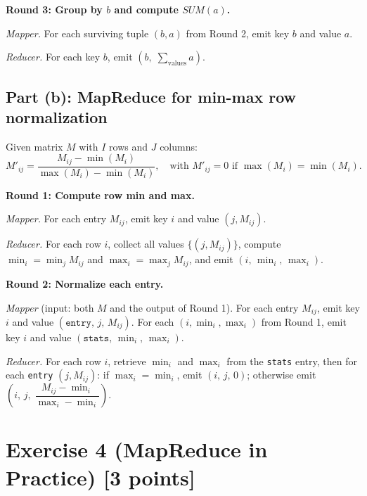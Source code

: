 \documentclass[a4paper,11pt]{article}
\begin{document}
\medskip

\textbf{Round 3: Group by $b$ and compute $SUM(a)$.}

\textit{Mapper.} For each surviving tuple $(b, a)$ from Round 2, emit key $b$ and value $a$.

\textit{Reducer.} For each key $b$, emit $(b,\; \sum_{\text{values}} a)$.

\subsection*{Part (b): MapReduce for min-max row normalization}

Given matrix $M$ with $I$ rows and $J$ columns:
\[
  M'_{ij} = \frac{M_{ij} - \min(M_i)}{\max(M_i) - \min(M_i)}, \quad
  \text{with } M'_{ij} = 0 \text{ if } \max(M_i) = \min(M_i).
\]

\medskip

\textbf{Round 1: Compute row min and max.}

\textit{Mapper.} For each entry $M_{ij}$, emit key $i$ and value $(j, M_{ij})$.

\textit{Reducer.} For each row $i$, collect all values $\{(j, M_{ij})\}$, compute $\min_i = \min_j M_{ij}$ and $\max_i = \max_j M_{ij}$, and emit $(i,\, \min_i,\, \max_i)$.

\medskip

\textbf{Round 2: Normalize each entry.}

\textit{Mapper} (input: both $M$ and the output of Round 1). For each entry $M_{ij}$, emit key $i$ and value $(\texttt{entry},\, j,\, M_{ij})$. For each $(i, \min_i, \max_i)$ from Round 1, emit key $i$ and value $(\texttt{stats},\, \min_i,\, \max_i)$.

\textit{Reducer.} For each row $i$, retrieve $\min_i$ and $\max_i$ from the \texttt{stats} entry, then for each \texttt{entry} $(j, M_{ij})$: if $\max_i = \min_i$, emit $(i,\, j,\, 0)$; otherwise emit $\left(i,\, j,\;\dfrac{M_{ij} - \min_i}{\max_i - \min_i}\right)$.

\newpage
\section*{Exercise 4 (MapReduce in Practice) [3 points]}
\end{document}

